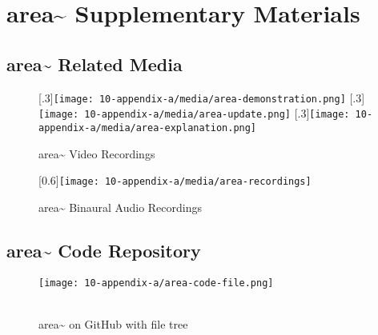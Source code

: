 \chapter{area\textasciitilde{} Supplementary Materials}

\section{area\textasciitilde{} Related Media}
\begin{figure}[!ht]
    \centering
    [.3\linewidth]{\texttt{[image: 10-appendix-a/media/area-demonstration.png]}}%
    \hfill
    [.3\linewidth]{\texttt{[image: 10-appendix-a/media/area-update.png]}}
    \hfill
    [.3\linewidth]{\texttt{[image: 10-appendix-a/media/area-explanation.png]}}
    \caption*{area\textasciitilde{} Video Recordings}
\end{figure}
\vspace*{1cm}
\begin{figure}[!ht]
    \centering
    [0.6\linewidth]{\texttt{[image: 10-appendix-a/media/area-recordings]}}
    \caption*{area\textasciitilde{} Binaural Audio Recordings}\label{sec: appendix-a-media}
\end{figure}
\clearpage



\section{area\textasciitilde{} Code Repository}
\begin{figure}[!ht]
    \texttt{[image: 10-appendix-a/area-code-file.png]}
    \caption*{ \\ area\textasciitilde{} on GitHub with file tree}\label{sec: appendix-a-code}
\end{figure}
\clearpage



